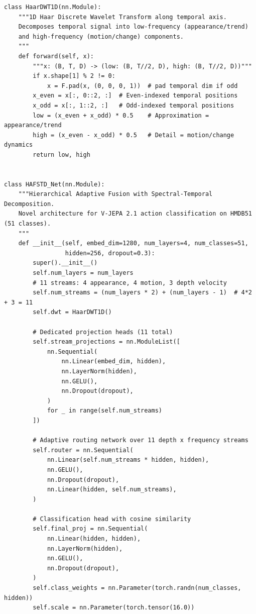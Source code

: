 \begin{lstlisting}[caption={HAF-STD Net architecture and spectral-temporal decomposition (HMDB51 configuration).}, label={lst:hafstd_arch_impl}]
class HaarDWT1D(nn.Module):
    """1D Haar Discrete Wavelet Transform along temporal axis.
    Decomposes temporal signal into low-frequency (appearance/trend)
    and high-frequency (motion/change) components.
    """
    def forward(self, x):
        """x: (B, T, D) -> (low: (B, T//2, D), high: (B, T//2, D))"""
        if x.shape[1] % 2 != 0:
            x = F.pad(x, (0, 0, 0, 1))  # pad temporal dim if odd
        x_even = x[:, 0::2, :]  # Even-indexed temporal positions
        x_odd = x[:, 1::2, :]   # Odd-indexed temporal positions
        low = (x_even + x_odd) * 0.5    # Approximation = appearance/trend
        high = (x_even - x_odd) * 0.5   # Detail = motion/change dynamics
        return low, high


class HAFSTD_Net(nn.Module):
    """Hierarchical Adaptive Fusion with Spectral-Temporal Decomposition.
    Novel architecture for V-JEPA 2.1 action classification on HMDB51 (51 classes).
    """
    def __init__(self, embed_dim=1280, num_layers=4, num_classes=51,
                 hidden=256, dropout=0.3):
        super().__init__()
        self.num_layers = num_layers
        # 11 streams: 4 appearance, 4 motion, 3 depth velocity
        self.num_streams = (num_layers * 2) + (num_layers - 1)  # 4*2 + 3 = 11
        self.dwt = HaarDWT1D()

        # Dedicated projection heads (11 total)
        self.stream_projections = nn.ModuleList([
            nn.Sequential(
                nn.Linear(embed_dim, hidden),
                nn.LayerNorm(hidden),
                nn.GELU(),
                nn.Dropout(dropout),
            )
            for _ in range(self.num_streams)
        ])

        # Adaptive routing network over 11 depth x frequency streams
        self.router = nn.Sequential(
            nn.Linear(self.num_streams * hidden, hidden),
            nn.GELU(),
            nn.Dropout(dropout),
            nn.Linear(hidden, self.num_streams),
        )

        # Classification head with cosine similarity
        self.final_proj = nn.Sequential(
            nn.Linear(hidden, hidden),
            nn.LayerNorm(hidden),
            nn.GELU(),
            nn.Dropout(dropout),
        )
        self.class_weights = nn.Parameter(torch.randn(num_classes, hidden))
        self.scale = nn.Parameter(torch.tensor(16.0))


\end{lstlisting}
